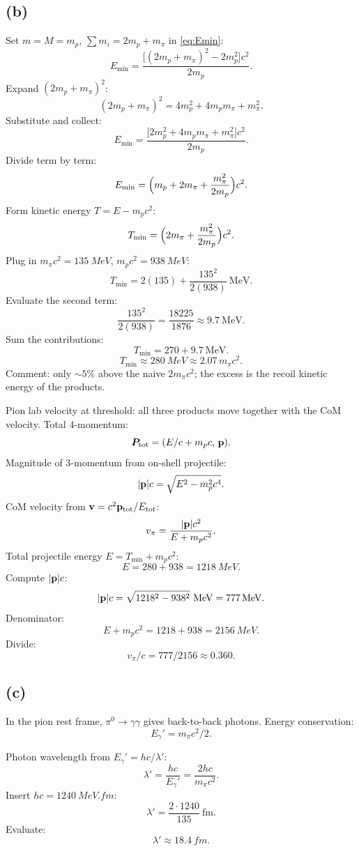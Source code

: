 \documentclass[11pt]{article}
\begin{document}
\subsection*{(b)}

Set $m=M=m_p$, $\sum m_i = 2m_p+m_\pi$ in \eqref{eq:Emin}:
\[ E_\text{min} = \frac{\bigl[(2m_p+m_\pi)^2 - 2m_p^2\bigr]c^2}{2m_p}. \]
Expand $(2m_p+m_\pi)^2$:
\[ (2m_p+m_\pi)^2 = 4m_p^2 + 4m_p m_\pi + m_\pi^2. \]
Substitute and collect:
\[ E_\text{min} = \frac{\bigl[2m_p^2 + 4m_p m_\pi + m_\pi^2\bigr]c^2}{2m_p}. \]
Divide term by term:
\[ E_\text{min} = \Bigl(m_p + 2m_\pi + \frac{m_\pi^2}{2m_p}\Bigr)c^2. \]
Form kinetic energy $T = E - m_pc^2$:
\[ T_\text{min} = \Bigl(2m_\pi + \frac{m_\pi^2}{2m_p}\Bigr)c^2. \]
Plug in $m_\pi c^2 = \SI{135}{MeV}$, $m_p c^2 = \SI{938}{MeV}$:
\[ T_\text{min} = 2(135) + \frac{135^2}{2(938)}\ \text{MeV}. \]
Evaluate the second term:
\[ \frac{135^2}{2(938)} = \frac{18225}{1876} \approx 9.7\ \text{MeV}. \]
Sum the contributions:
\[ T_\text{min} = 270 + 9.7\ \text{MeV}. \]
\[ \boxed{\;T_\text{min} \approx \SI{280}{MeV} \approx 2.07\,m_\pi c^2.\;} \]
Comment: only $\sim 5\%$ above the naive $2m_\pi c^2$; the excess is the recoil kinetic energy of the products.

Pion lab velocity at threshold: all three products move together with the CoM velocity. Total 4-momentum:
\[ \bm P_\text{tot} = (E/c+m_pc,\,\vb p). \]
Magnitude of 3-momentum from on-shell projectile:
\[ |\vb p|c = \sqrt{E^2-m_p^2c^4}. \]
CoM velocity from $\vb v = c^2\vb p_\text{tot}/E_\text{tot}$:
\[ v_\pi = \frac{|\vb p|c^2}{E+m_pc^2}. \]
Total projectile energy $E = T_\text{min}+m_pc^2$:
\[ E = 280 + 938 = \SI{1218}{MeV}. \]
Compute $|\vb p|c$:
\[ |\vb p|c = \sqrt{1218^2 - 938^2}\ \text{MeV} = \SI{777}{MeV}. \]
Denominator:
\[ E+m_pc^2 = 1218 + 938 = \SI{2156}{MeV}. \]
Divide:
\[ \boxed{\;v_\pi/c = 777/2156 \approx 0.360.\;} \]

\subsection*{(c)}

In the pion rest frame, $\pi^0\to\gamma\gamma$ gives back-to-back photons. Energy conservation:
\[ E_\gamma' = m_\pi c^2/2. \]

Photon wavelength from $E_\gamma' = hc/\lambda'$:
\[ \lambda' = \frac{hc}{E_\gamma'} = \frac{2hc}{m_\pi c^2}. \]
Insert $hc = \SI{1240}{MeV.fm}$:
\[ \lambda' = \frac{2\cdot 1240}{135}\ \text{fm}. \]
Evaluate:
\[ \boxed{\;\lambda' \approx \SI{18.4}{fm}.\;} \]
\end{document}
